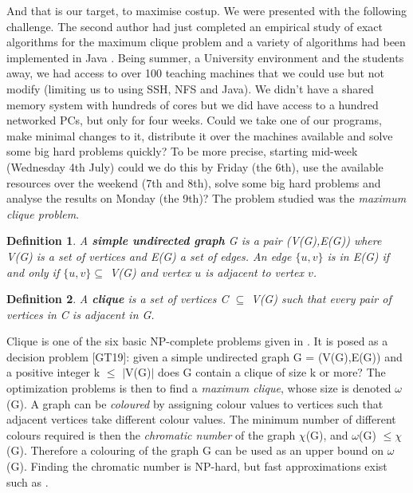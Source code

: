 \documentclass{l4proj}
\newtheorem{definition}{Definition}
\begin{document}
And that is our target, to maximise costup. We were presented with the following challenge. The second author had just completed an 
empirical study of exact algorithms for the maximum clique problem and a variety of algorithms had been implemented
in Java \cite{tr-2012-333}. Being summer, a University environment and the students away, we had access to over 100 teaching machines that we could
use but not modify (limiting us to using SSH, NFS and Java). We didn't have a shared memory system with hundreds of cores but we
did have access to a hundred networked PCs, but only for four weeks.
Could we take one of our programs, make minimal changes to it, distribute it over the machines 
available and solve some big hard problems quickly? To be more precise, starting mid-week (Wednesday 4th July) 
could we do this by Friday (the 6th),
use the available resources over the weekend (7th and 8th), solve some big hard problems and analyse the results on Monday (the 9th)? 
The problem studied was the \emph{maximum clique problem}.

\begin{definition}
A \textbf{simple undirected graph} G is a pair (V(G),E(G)) where V(G) is a set of vertices and E(G) a set of edges. An edge
$\{u,v\}$ is in E(G) if and only if $\{u,v\} \subseteq$ V(G) and vertex $u$ is adjacent to vertex $v$.
\end{definition}

\begin{definition}
 A \textbf{clique} is a
set of vertices C $\subseteq$ V(G) such that every pair of vertices in C is adjacent in G.
\end{definition}

Clique is one of the six basic NP-complete problems given in \cite{gareyJohnson}. It is posed as a decision
problem [GT19]: given a simple undirected graph G = (V(G),E(G)) and a positive integer k $\leq$ $|$V(G)$|$ does G contain a clique of size
k or more? The optimization problems is then to find a \emph{maximum clique}, whose size is denoted $\omega$(G).
A graph can be \emph{coloured} by assigning colour values to vertices such that adjacent vertices take different colour values.
The minimum number of different colours required is then the
\emph{chromatic number} of the graph $\chi$(G), and $\omega$(G) $\leq \chi$(G). 
Therefore a colouring of the graph G can be used as an upper bound on $\omega$(G).
Finding the chromatic number is NP-hard, but fast approximations exist such as \cite{welshPowell,brelaz}.
\end{document}
